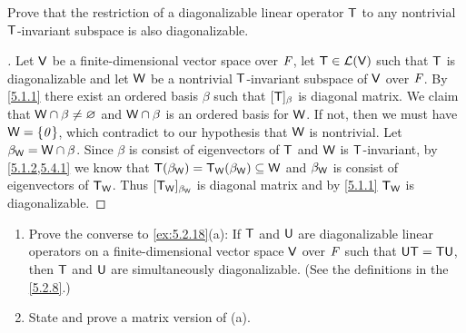 \begin{ex}\label{ex:5.4.24}
	Prove that the restriction of a diagonalizable linear operator \(\mathsf{T}\) to any nontrivial \(\mathsf{T}\)-invariant subspace is also diagonalizable.
\end{ex}

\begin{proof}[]
	Let \(\mathsf{V}\) be a finite-dimensional vector space over \(\mathit{F}\), let \(\mathsf{T} \in \mathcal{L}(\mathsf{V})\) such that \(\mathsf{T}\) is diagonalizable and let \(\mathsf{W}\) be a nontrivial \(\mathsf{T}\)-invariant subspace of \(\mathsf{V}\) over \(\mathit{F}\).
	By \cref{5.1.1} there exist an ordered basis \(\beta\) such that \([\mathsf{T}]_{\beta}\) is diagonal matrix.
	We claim that \(\mathsf{W} \cap \beta \neq \varnothing\) and \(\mathsf{W} \cap \beta\) is an ordered basis for \(\mathsf{W}\).
	If not, then we must have \(\mathsf{W} = \left\lbrace\mathit{0}\right\rbrace\), which contradict to our hypothesis that \(\mathsf{W}\) is nontrivial.
	Let \(\beta_{\mathsf{W}} = \mathsf{W} \cap \beta\).
	Since \(\beta\) is consist of eigenvectors of \(\mathsf{T}\) and \(\mathsf{W}\) is \(\mathsf{T}\)-invariant, by \cref{5.1.2,5.4.1} we know that \(\mathsf{T}(\beta_{\mathsf{W}}) = \mathsf{T}_{\mathsf{W}}(\beta_{\mathsf{W}}) \subseteq \mathsf{W}\) and \(\beta_{\mathsf{W}}\) is consist of eigenvectors of \(\mathsf{T}_{\mathsf{W}}\).
	Thus \([\mathsf{T}_{\mathsf{W}}]_{\beta_{\mathsf{W}}}\) is diagonal matrix and by \cref{5.1.1} \(\mathsf{T}_{\mathsf{W}}\) is diagonalizable.
\end{proof}

\begin{ex}\label{ex:5.4.25}
	\begin{enumerate}
		\item Prove the converse to \cref{ex:5.2.18}(a):
		      If \(\mathsf{T}\) and \(\mathsf{U}\) are diagonalizable linear operators on a finite-dimensional vector space \(\mathsf{V}\) over \(\mathit{F}\) such that \(\mathsf{U} \mathsf{T} = \mathsf{T} \mathsf{U}\), then \(\mathsf{T}\) and \(\mathsf{U}\) are simultaneously diagonalizable.
		      (See the definitions in the \cref{5.2.8}.)
		\item State and prove a matrix version of (a).
	\end{enumerate}
\end{ex}

